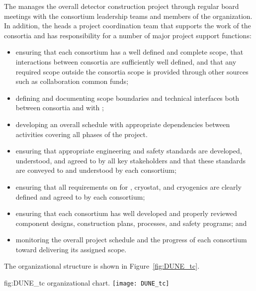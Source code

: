 The  manages the overall detector construction project
through regular board meetings with the consortium leadership teams 
and members of the  organization.  
%
In addition, the  heads %
a project coordination team that supports the work of 
the consortia and has responsibility for a number of major project 
support functions: 
\begin{itemize}
\item ensuring that each consortium has a well defined and complete
  scope, that interactions between consortia are sufficiently 
  well defined, and that any required scope outside the 
  consortia scope is provided through other sources such as collaboration
  common funds;
\item defining and documenting scope boundaries and technical 
  interfaces both between consortia and with ;  
\item developing an overall schedule with appropriate dependencies
  between activities covering all phases of the project. 
\item ensuring that appropriate engineering and safety standards 
  are developed, understood, and agreed to by all key stakeholders 
  and that these standards are conveyed to and understood by each
  consortium;
\item ensuring that all  requirements on  
  for , cryostat, and cryogenics are clearly defined and 
  agreed to by each consortium;
\item ensuring that each consortium has well developed and properly reviewed
  component designs, construction plans,  processes, and 
  safety programs; and
\item monitoring the overall project schedule and the progress of 
  each consortium toward delivering its assigned scope. 
\end{itemize}

The   organizational structure is shown 
in Figure~\ref{fig:DUNE_tc}.  

\begin{dunefigure}{fig:DUNE_tc}
  {  organizational chart.}
  \texttt{[image: DUNE\_tc]}
\end{dunefigure}

